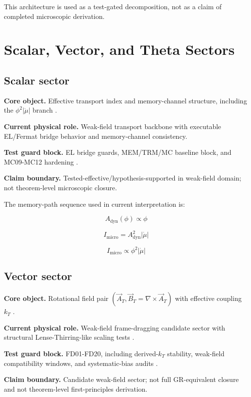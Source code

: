 \documentclass[11pt,a4paper]{article}
\begin{document}
This architecture is used as a test-gated decomposition, not as a claim of completed microscopic derivation.

\section{Scalar, Vector, and Theta Sectors}

\subsection{Scalar sector}

\textbf{Core object.} Effective transport index and memory-channel structure, including the \(\phi^2\lvert\dot{\mu}\rvert\) branch \cite{trm_status_v3}.

\textbf{Current physical role.} Weak-field transport backbone with executable EL/Fermat bridge behavior and memory-channel consistency.

\textbf{Test guard block.} EL bridge guards, MEM/TRM/MC baseline block, and MC09-MC12 hardening \cite{real_physics_coverage,trm_status_v3}.

\textbf{Claim boundary.} Tested-effective/hypothesis-supported in weak-field domain; not theorem-level microscopic closure.

The memory-path sequence used in current interpretation is:

\[
A_{\mathrm{dyn}}(\phi)\propto \phi
\]

\[
I_{\mathrm{micro}} = A_{\mathrm{dyn}}^2\lvert\dot{\mu}\rvert
\]

\[
I_{\mathrm{micro}} \propto \phi^2\lvert\dot{\mu}\rvert
\]

\subsection{Vector sector}

\textbf{Core object.} Rotational field pair \((\vec A_T,\vec B_T=\nabla\times\vec A_T)\) with effective coupling \(k_T\) \cite{field_sector_map}.

\textbf{Current physical role.} Weak-field frame-dragging candidate sector with structural Lense-Thirring-like scaling tests \cite{lense_thirring}.

\textbf{Test guard block.} FD01-FD20, including derived-\(k_T\) stability, weak-field compatibility windows, and systematic-bias audits \cite{trm_status_v3,real_physics_coverage}.

\textbf{Claim boundary.} Candidate weak-field sector; not full GR-equivalent closure and not theorem-level first-principles derivation.
\end{document}
